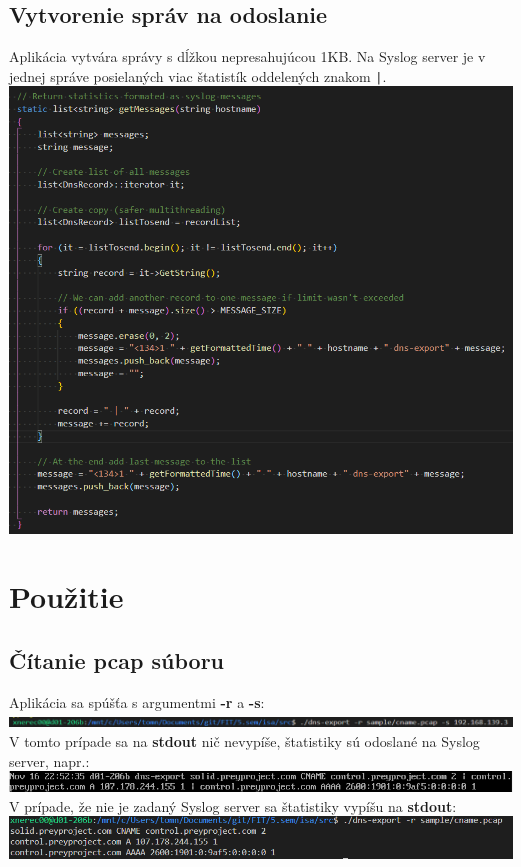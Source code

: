 \documentclass{article}
\begin{document}
        \subsection{Vytvorenie správ na odoslanie}
        Aplikácia vytvára správy s dĺžkou nepresahujúcou 1KB. Na Syslog server je v jednej správe posielaných viac štatistík oddelených znakom \texttt{|}.
        \includegraphics {messages.png}

    \section{Použitie}
        \subsection{Čítanie pcap súboru}
        Aplikácia sa spúšťa s argumentmi \textbf{-r} a \textbf{-s}:\\
        \includegraphics {r1.png}
        V tomto prípade sa na \textbf{stdout} nič nevypíše, štatistiky sú odoslané na Syslog server, napr.:\\
        \includegraphics {r2.png}
        V prípade, že nie je zadaný Syslog server sa štatistiky vypíšu na \textbf{stdout}:\\
        \includegraphics {r3.png}
\end{document}
